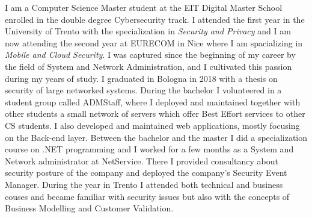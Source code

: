 
\par{
I am a Computer Science Master student at the EIT Digital Master School enrolled in the double degree Cybersecurity track. I attended the first year in the University of Trento with the specialization in \textit{Security and Privacy} and I am now attending the second year at EURECOM in Nice where I am spacializing in \textit{Mobile and Cloud Security}.
I was captured since the beginning of my career by the field of System and Network Administration,
 and I cultivated this passion during my years of study. I graduated in Bologna in 2018 with a thesis on security of large networked systems. During the bachelor I volunteered in a student
group called ADMStaff, where I deployed and maintained together with other students a small network of
servers which offer Best Effort services to other CS students.
I also developed and maintained web applications, mostly focusing on the Back-end layer.
Between the bachelor and the master I did a specialization course on .NET programming and I worked for a few months as a System and Network administrator at NetService. There I provided consultancy about security posture of the company and deployed the company's Security Event Manager. 
During the year in Trento I attended both technical and business couses and became familiar with security issues but also with the concepts of Business Modelling and Customer Validation. 
}
